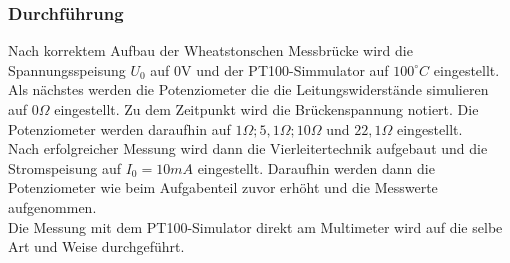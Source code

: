 \documentclass[a4paper,11pt,oneside]{article}
\begin{document}
\subsubsection{Durchführung}
Nach korrektem Aufbau der Wheatstonschen Messbrücke wird die Spannungsspeisung $U_0$ auf 0V und der PT100-Simmulator auf $100^\circ C$ eingestellt. Als nächstes werden die Potenziometer die die Leitungswiderstände simulieren auf $0\Omega$ eingestellt. Zu dem Zeitpunkt wird die Brückenspannung notiert. Die Potenziometer werden daraufhin auf $ 1\Omega; 5,1\Omega; 10\Omega $ und $ 22,1\Omega$ eingestellt.\\
Nach erfolgreicher Messung wird dann die Vierleitertechnik  aufgebaut und die Stromspeisung auf $I_0=10mA$ eingestellt. Daraufhin werden dann die Potenziometer wie beim Aufgabenteil zuvor erhöht und die Messwerte aufgenommen.\\
Die Messung mit dem PT100-Simulator direkt am Multimeter wird auf die selbe Art und Weise durchgeführt. 
\end{document}
